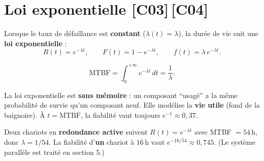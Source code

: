 \documentclass[a4paper,11pt]{article}
\begin{document}
\section{Loi exponentielle \hfill {\normalsize\color{uimmred}[C03]\,[C04]}}

\begin{definition}
Lorsque le taux de défaillance est \textbf{constant} ($\lambda(t) = \lambda$), la durée de vie suit une \textbf{loi exponentielle} :
\[
\boxed{R(t) = e^{-\lambda t}}, \qquad F(t) = 1 - e^{-\lambda t}, \qquad f(t) = \lambda\,e^{-\lambda t}.
\]
\end{definition}

\begin{theoreme}
\[
\text{MTBF} = \int_0^{+\infty} e^{-\lambda t}\,dt = \frac{1}{\lambda}.
\]
\end{theoreme}

\begin{center}
\end{center}

\begin{remarque}
La loi exponentielle est \textbf{sans mémoire} : un composant ``usagé'' a la même probabilité de survie qu'un composant neuf. Elle modélise la \textbf{vie utile} (fond de la baignoire). À $t = \text{MTBF}$, la fiabilité vaut toujours $e^{-1} \approx 0{,}37$.
\end{remarque}

\begin{exemple}
Deux chariots en \textbf{redondance active} suivent $R(t) = e^{-\lambda t}$ avec MTBF $= 54$\,h, donc $\lambda = 1/54$. La fiabilité d'\textbf{un} chariot à $16$\,h vaut $e^{-16/54} \approx 0{,}745$. (Le système parallèle est traité en section 5.)
\end{exemple}
\end{document}
